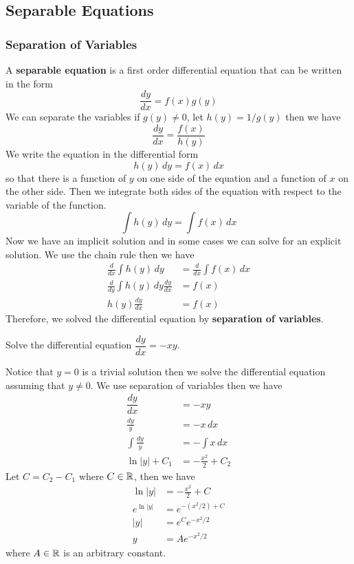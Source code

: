 \subsection{Separable Equations}
\subsubsection{Separation of Variables}
A \textbf{separable equation} is a first order differential equation that can
be written in the form \[\frac{dy}{dx}=f(x)g(y)\]
We can separate the variables if \(g(y)\neq0\), let \(h(y)=1/g(y)\) then we
have \[\frac{dy}{dx}=\frac{f(x)}{h(y)}\]
We write the equation in the differential form \[h(y)\,dy=f(x)\,dx\] so that
there is a function of \(y\) on one side of the equation and a function of
\(x\) on the other side.
Then we integrate both sides of the equation with respect to the variable of
the function.
\[\int h(y)\,dy=\int f(x)\,dx\]
Now we have an implicit solution and in some cases we can solve for an
explicit solution.
We use the chain rule then we have
\begin{align*}
    \frac{d}{dx}\int h(y)\,dy &= \frac{d}{dx}\int f(x)\,dx \\
    \frac{d}{dy}\int h(y)\,dy\frac{dy}{dx} &= f(x) \\
    h(y)\frac{dy}{dx} &= f(x)
\end{align*}
Therefore, we solved the differential equation by
\textbf{separation of variables}.
\begin{problem}
    Solve the differential equation \(\dfrac{dy}{dx}=-xy\).
\end{problem}
\begin{solution}
    Notice that \(y=0\) is a trivial solution then we solve the differential
    equation assuming that \(y\neq 0\).
    We use separation of variables then we have
    \begin{align*}
        \dfrac{dy}{dx}&=-xy\\\frac{dy}{y}&=-x\,dx\\\int\frac{dy}{y}
        &=-\int x\,dx\\\ln |y|+C_1&=-\frac{x^2}{2}+C_2
    \end{align*}
    Let \(C=C_2-C_1\) where \(C\in\mathbb{R}\), then we have
    \begin{align*}
        \ln |y|&=-\frac{x^2}{2}+C\\e^{\ln |y|}&=e^{-(x^2/2)+C}\\
        |y|&=e^Ce^{-x^2/2}\\y&=Ae^{-x^2/2}
    \end{align*}
    where \(A\in\mathbb{R}\) is an arbitrary constant.
\end{solution}
